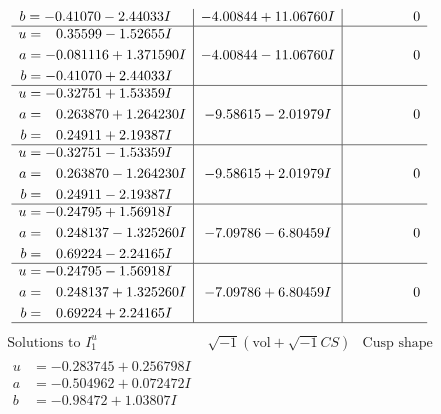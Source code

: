 \documentclass[1p]{elsarticle_modified}
\theoremstyle{definition}
\newcommand{\I}{\sqrt{-1}}
\begin{document}
$$\begin{array}{c|c|c}
\begin{aligned}
b &= -0.41070 - 2.44033 I\end{aligned}
 & -4.00844 + 11.06760 I & \phantom{-0.000000 } 0 \\ \hline\begin{aligned}
u &= \phantom{-}0.35599 - 1.52655 I \\
a &= -0.081116 + 1.371590 I \\
b &= -0.41070 + 2.44033 I\end{aligned}
 & -4.00844 - 11.06760 I & \phantom{-0.000000 } 0 \\ \hline\begin{aligned}
u &= -0.32751 + 1.53359 I \\
a &= \phantom{-}0.263870 + 1.264230 I \\
b &= \phantom{-}0.24911 + 2.19387 I\end{aligned}
 & -9.58615 - 2.01979 I & \phantom{-0.000000 } 0 \\ \hline\begin{aligned}
u &= -0.32751 - 1.53359 I \\
a &= \phantom{-}0.263870 - 1.264230 I \\
b &= \phantom{-}0.24911 - 2.19387 I\end{aligned}
 & -9.58615 + 2.01979 I & \phantom{-0.000000 } 0 \\ \hline\begin{aligned}
u &= -0.24795 + 1.56918 I \\
a &= \phantom{-}0.248137 - 1.325260 I \\
b &= \phantom{-}0.69224 - 2.24165 I\end{aligned}
 & -7.09786 - 6.80459 I & \phantom{-0.000000 } 0 \\ \hline\begin{aligned}
u &= -0.24795 - 1.56918 I \\
a &= \phantom{-}0.248137 + 1.325260 I \\
b &= \phantom{-}0.69224 + 2.24165 I\end{aligned}
 & -7.09786 + 6.80459 I & \phantom{-0.000000 } 0\\
 \hline 
 \end{array}$$\newpage$$\begin{array}{c|c|c}  
\text{Solutions to }I^u_{1}& \I (\text{vol} + \sqrt{-1}CS) & \text{Cusp shape}\\
 \hline 
\begin{aligned}
u &= -0.283745 + 0.256798 I \\
a &= -0.504962 + 0.072472 I \\
b &= -0.98472 + 1.03807 I\end{aligned}

\end{array}$$
\end{document}
